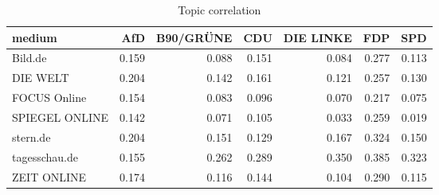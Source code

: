 \begin{table}[ht]
\centering
\begin{tabular}{lrrrrrr}
  \hline
medium & AfD & B90/GRÜNE & CDU & DIE LINKE & FDP & SPD \\ 
  \hline
Bild.de & 0.159 & 0.088 & 0.151 & 0.084 & 0.277 & 0.113 \\ 
  DIE WELT & 0.204 & 0.142 & 0.161 & 0.121 & 0.257 & 0.130 \\ 
  FOCUS Online & 0.154 & 0.083 & 0.096 & 0.070 & 0.217 & 0.075 \\ 
  SPIEGEL ONLINE & 0.142 & 0.071 & 0.105 & 0.033 & 0.259 & 0.019 \\ 
  stern.de & 0.204 & 0.151 & 0.129 & 0.167 & 0.324 & 0.150 \\ 
  tagesschau.de & 0.155 & 0.262 & 0.289 & 0.350 & 0.385 & 0.323 \\ 
  ZEIT ONLINE & 0.174 & 0.116 & 0.144 & 0.104 & 0.290 & 0.115 \\ 
   \hline
\end{tabular}
\caption{Topic correlation} 
\end{table}
